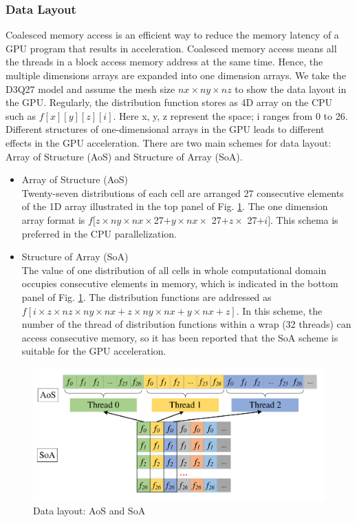 \documentclass[10pt]{elsarticle}
\begin{document}
\subsubsection{Data Layout} 
Coalesced memory access is an efficient way to reduce the memory latency of a GPU program that results in acceleration. Coalesced memory access means all the threads in a block access memory address at the same time. Hence, the multiple dimensions arrays are expanded into one dimension arrays. We take the D3Q27 model and assume the mesh size $nx\times ny\times nz$ to show the data layout in the GPU. Regularly, the distribution function stores as 4D array on the CPU such as $f[x][y][z][i]$. Here x, y, z represent the space; i ranges from 0 to 26.  Different structures of one-dimensional arrays in the GPU leads to different effects in the GPU acceleration. There are two main schemes for data layout: Array of Structure (AoS) and Structure of Array (SoA). 
\begin{itemize}
\item Array of Structure (AoS)\\
Twenty-seven distributions of each cell are arranged 27 consecutive elements of the 1D array illustrated in the top panel of Fig. \ref{fig:layout}. The one dimension array format is $f[z\times ny\times nx\times $27$+y\times nx\times$ 27$+z\times$ 27$+i]$. This schema is preferred in the CPU parallelization.
\item Structure of Array (SoA)\\
The value of one distribution of all cells in whole computational domain occupies consecutive elements in memory, which is indicated in the bottom panel of Fig. \ref{fig:layout}. The distribution functions are addressed as $f[i\times z\times nz\times ny\times nx+z \times ny\times nx+y\times nx+z]$. In this scheme, the number of the thread of distribution functions within a wrap (32 threads) can access consecutive memory, so it has been reported that the SoA scheme is suitable for the GPU acceleration\cite{rf:Delbosc14}.
\end{itemize}
\begin{figure}[!htbp]
\centering
\includegraphics[width=1.0\textwidth]{Structure.pdf}
\vspace{-15pt}
\caption{Data layout: AoS and SoA}
\label{fig:layout}
\end{figure}
\end{document}
